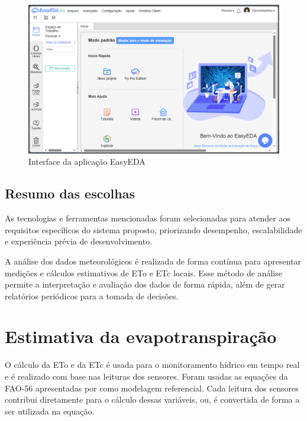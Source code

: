 \begin{figure}[!htb] \centering
  \caption{Interface da aplicação EasyEDA} \label{figura:easyeda}
  \begin{varwidth}{\linewidth}
    \includegraphics[width=16cm]{figuras/easyeda.png}
  \end{varwidth}
\end{figure}

\subsection{Resumo das escolhas}
As tecnologias e ferramentas mencionadas foram selecionadas para atender aos requisitos específicos do sistema proposto, priorizando desempenho, escalabilidade e experiência prévia de desenvolvimento.

A análise dos dados meteorológicos é realizada de forma contínua para apresentar medições e cálculos estimativos de ETo e ETc locais. Esse método de análise permite a interpretação e avaliação dos dados de forma rápida, além de gerar relatórios periódicos para a tomada de decisões.

\section{Estimativa da evapotranspiração}

O cálculo da ETo e da ETc é usada para o monitoramento hídrico em tempo real e é realizado com base nas leituras dos sensores. Foram usadas as equações da FAO-56 apresentadas por \textcite{Allen_evapotranspiration1998} como modelagem referencial. Cada leitura dos sensores contribui diretamente para o cálculo dessas variáveis, ou, é convertida de forma a ser utilizada na equação.

